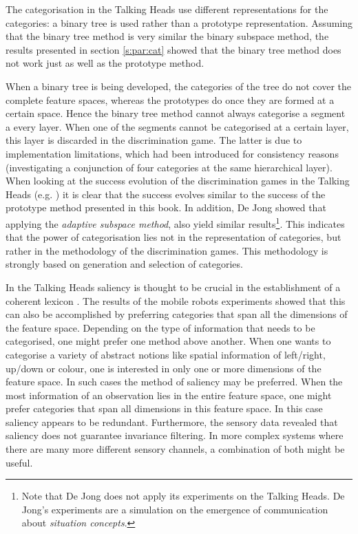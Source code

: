 The categorisation in the Talking Heads use different representations for the categories: a binary tree is used rather than a prototype representation. Assuming that the binary tree method is very similar the binary subspace method, the results presented in section \ref{s:par:cat} showed that the binary tree method does not work just as well as the prototype method.

When a binary tree is being developed, the categories of the tree do not cover the complete feature spaces, whereas the prototypes do once they are formed at a certain space. Hence the binary tree method cannot always categorise a segment a every layer. When one of the segments cannot be categorised at a certain layer, this layer is discarded in the discrimination game. The latter is due to implementation limitations, which had been introduced for consistency reasons (investigating a conjunction of four categories at the same hierarchical layer). When looking at the success evolution of the discrimination games in the Talking Heads (e.g. \citep{steels:2000}) it is clear that the success evolves similar to the success of the prototype method presented in this book. In addition, De Jong \citep{dejongvogt:1998,dejong:2000} showed that applying  the {\em adaptive subspace method}, also yield similar results\footnote{Note that De Jong does not apply its experiments on the Talking Heads. De Jong's experiments are a simulation on the emergence of communication about {\em situation concepts}.}. This indicates that the power of categorisation lies not in the representation of categories, but rather in the methodology of the discrimination games. This methodology is strongly based on generation and selection of categories.


In the Talking Heads saliency is thought to be crucial in the establishment of a coherent lexicon \citep{steels:2000}. The results of the mobile robots experiments showed that this can also be accomplished by preferring categories that span all the dimensions of the feature space. Depending on the type of information that needs to be categorised, one might prefer one method above another. When one wants to categorise a variety of abstract notions like spatial information of left/right, up/down or colour, one is interested in only one or more dimensions of the feature space. In such cases the method of saliency may be preferred. When the most information of an observation lies in the entire feature space, one might prefer categories that span all dimensions in this feature space. In this case saliency appears to be redundant. Furthermore, the sensory data revealed that saliency does not guarantee invariance filtering. In more complex systems where there are many more different sensory channels, a combination of both might be useful.


